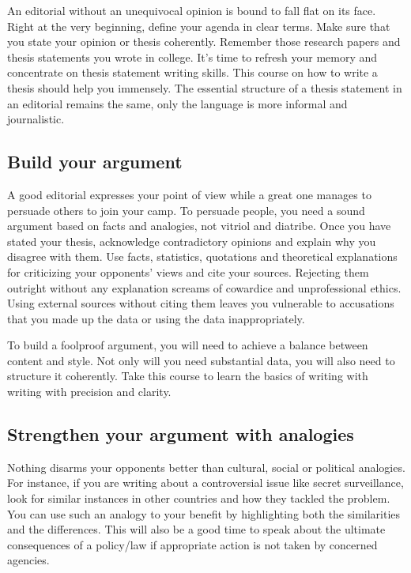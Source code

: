 \documentclass{tufte-handout}\usepackage[]{graphicx}\usepackage[]{color}
\begin{document}
An editorial without an unequivocal opinion is bound to fall flat on its face. Right at the very beginning, define your agenda in clear terms. Make sure that you state your opinion or thesis coherently. Remember those research papers and thesis statements you wrote in college. It's time to refresh your memory and concentrate on thesis statement writing skills. This course on how to write a thesis should help you immensely. The essential structure of a thesis statement in an editorial remains the same, only the language is more informal and journalistic.

\subsection{Build your argument}
A good editorial expresses your point of view while a great one manages to persuade others to join your camp. To persuade people, you need a sound argument based on facts and analogies, not vitriol and diatribe. Once you have stated your thesis, acknowledge contradictory opinions and explain why you disagree with them. Use facts, statistics, quotations and theoretical explanations for criticizing your opponents' views and cite your sources. Rejecting them outright without any explanation screams of cowardice and unprofessional ethics. Using external sources without citing them leaves you vulnerable to accusations that you made up the data or using the data inappropriately. 

To build a foolproof argument, you will need to achieve a balance between content and style. Not only will you need substantial data, you will also need to structure it coherently. Take this course to learn the basics of writing with writing with precision and clarity.


\subsection{Strengthen your argument with analogies}
Nothing disarms your opponents better than cultural, social or political analogies. For instance, if you are writing about a controversial issue like secret surveillance, look for similar instances in other countries and how they tackled the problem. You can use such an analogy to your benefit by highlighting both the similarities and the differences. This will also be a good time to speak about the ultimate consequences of a policy/law if appropriate action is not taken by concerned agencies.
\end{document}
